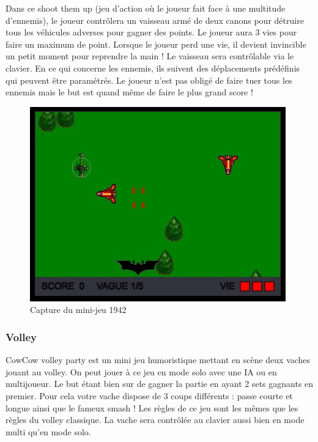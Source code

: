Dans ce shoot them up (jeu d’action où le joueur fait face à une multitude d’ennemis), 
le joueur contrôlera un vaisseau armé de deux canons pour détruire tous les véhicules adverses pour gagner des points. 
Le joueur aura 3 vies pour faire un maximum de point. Lorsque le joueur perd une vie, il devient invincible un petit moment pour reprendre la main ! 
Le vaisseau sera contrôlable via le clavier. En ce qui concerne les ennemis, ils suivent des déplacements prédéfinis qui peuvent être paramétrés. 
Le joueur n’est pas obligé de faire tuer tous les ennemis mais le but est quand même de faire le plus grand score !

\begin{figure}
 \includegraphics[width=\linewidth]{img/capturejeu_1942}
 \caption{Capture du mini-jeu 1942}
 \label{fig:game_1942}
\end{figure}

\subsubsection{Volley}


CowCow volley party  est un mini jeu humoristique mettant en scène deux vaches jouant au volley.
On peut jouer à ce jeu en mode solo avec une IA ou en multijoueur. 
Le but étant bien sur de gagner la partie en ayant 2 sets gagnants en premier. 
Pour cela votre vache dispose de 3 coups différents : passe courte et longue ainsi que le fameux smash !
Les règles de ce jeu sont les mêmes que les règles du volley classique. La vache sera contrôlée au clavier aussi bien  en mode multi qu’en mode solo.

